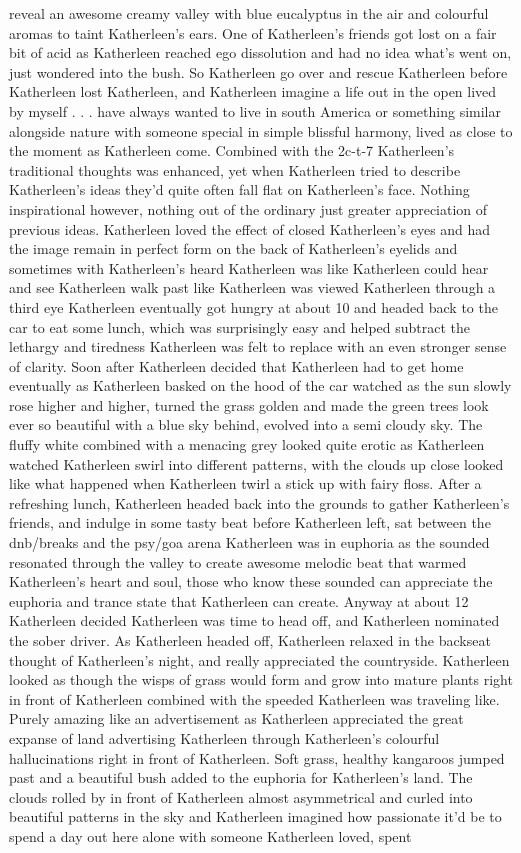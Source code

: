 \documentclass[12pt]{book}
\begin{document}
reveal an awesome creamy valley with blue eucalyptus in the air and colourful aromas to taint Katherleen's ears. One of Katherleen's friends got lost on a fair bit of acid as Katherleen reached ego dissolution and had no idea what's went on, just wondered into the bush. So Katherleen go over and rescue Katherleen before Katherleen lost Katherleen, and Katherleen imagine a life out in the open lived by myself . . .  have always wanted to live in south America or something similar alongside nature with someone special in simple blissful harmony, lived as close to the moment as Katherleen come. Combined with the 2c-t-7 Katherleen's traditional thoughts was enhanced, yet when Katherleen tried to describe Katherleen's ideas they'd quite often fall flat on Katherleen's face. Nothing inspirational however, nothing out of the ordinary just greater appreciation of previous ideas. Katherleen loved the effect of closed Katherleen's eyes and had the image remain in perfect form on the back of Katherleen's eyelids and sometimes with Katherleen's heard Katherleen was like Katherleen could hear and see Katherleen walk past like Katherleen was viewed Katherleen through a third eye Katherleen eventually got hungry at about 10 and headed back to the car to eat some lunch, which was surprisingly easy and helped subtract the lethargy and tiredness Katherleen was felt to replace with an even stronger sense of clarity. Soon after Katherleen decided that Katherleen had to get home eventually as Katherleen basked on the hood of the car watched as the sun slowly rose higher and higher, turned the grass golden and made the green trees look ever so beautiful with a blue sky behind, evolved into a semi cloudy sky. The fluffy white combined with a menacing grey looked quite erotic as Katherleen watched Katherleen swirl into different patterns, with the clouds up close looked like what happened when Katherleen twirl a stick up with fairy floss. After a refreshing lunch, Katherleen headed back into the grounds to gather Katherleen's friends, and indulge in some tasty beat before Katherleen left, sat between the dnb/breaks and the psy/goa arena Katherleen was in euphoria as the sounded resonated through the valley to create awesome melodic beat that warmed Katherleen's heart and soul, those who know these sounded can appreciate the euphoria and trance state that Katherleen can create. Anyway at about 12 Katherleen decided Katherleen was time to head off, and Katherleen nominated the sober driver. As Katherleen headed off, Katherleen relaxed in the backseat thought of Katherleen's night, and really appreciated the countryside. Katherleen looked as though the wisps of grass would form and grow into mature plants right in front of Katherleen combined with the speeded Katherleen was traveling like. Purely amazing like an advertisement as Katherleen appreciated the great expanse of land advertising Katherleen through Katherleen's colourful hallucinations right in front of Katherleen. Soft grass, healthy kangaroos jumped past and a beautiful bush added to the euphoria for Katherleen's land. The clouds rolled by in front of Katherleen almost asymmetrical and curled into beautiful patterns in the sky and Katherleen imagined how passionate it'd be to spend a day out here alone with someone Katherleen loved, spent 
\end{document}
